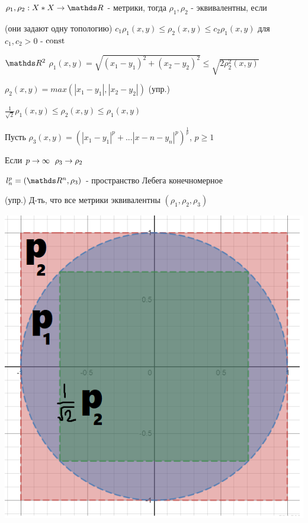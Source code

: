 \documentclass[12pt, fleqn]{article}
\begin{document}
\begin{definition}
    $\rho_1, \rho_2: X*X \ra \R$ - метрики, тогда $\rho_1, \rho_2$ - эквивалентны, если 
    
    (они задают одну топологию) $c_1 \rho_1 (x,y) \leqslant \rho_2 (x,y) \leqslant c_2 \rho_1(x,y)$ для $c_1,c_2>0$ - $\mathop{\rm const}\nolimits$
\end{definition}

\begin{example}
    $\R^2$ $\rho_1(x,y) = \sqrt{(x_1-y_1)^2 + (x_2-y_2)^2} \leqslant \sqrt{2 \rho_2^2(x,y)}$
    
    $\rho_2(x,y)=max(|x_1-y_1|, |x_2-y_2|)$ (упр.)
    
    $\frac{1}{\sqrt{2}} \rho_1(x,y) \leqslant \rho_2(x,y) \leqslant \rho_1(x,y)$
    
    Пусть $\rho_3(x,y)=(|x_1-y_1|^p+...|x-n-y_n|^p)^{\frac{1}{p}}$, $p \geqslant 1$
    
    Если $p \rightarrow \infty$ $\rho_3 \rightarrow \rho_2$
    
    $l_n^p=(\R^n,\rho_3)$ - пространство Лебега конечномерное
    
    (упр.) Д-ть, что все метрики эквивалентны $(\rho_1,\rho_2,\rho_3)$
    
    \includegraphics[scale=0.3]{pics/p1p2p3.png}
\end{example}
\end{document}
